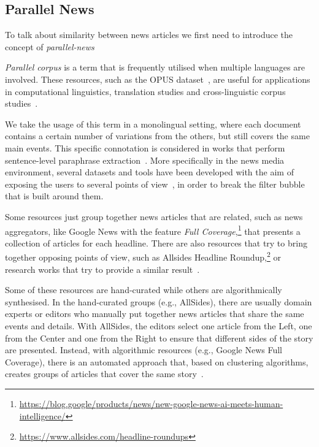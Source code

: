 \subsection{Parallel News}
\label{ssec:lit_relationships_parallel}

To talk about similarity between news articles we first need to introduce the concept of \emph{\gls{parallel-news}}

\emph{Parallel corpus} is a term that is frequently utilised when multiple languages are involved.
These resources, such as the OPUS dataset~\citep{tiedemann2012parallel}, are useful for applications in computational linguistics, translation studies and cross-linguistic corpus studies~\citep{brown1991aligning,ramesh2022samanantar,ziemski2016united,kunchukuttan2017iit,banon2020paracrawl}.

We take the usage of this term in a monolingual setting, where each document contains a certain number of variations from the others, but still covers the same main events.
This specific connotation is considered in works that perform sentence-level paraphrase extraction~\citep{dolan2004unsupervised,zhang2013harvesting}.
More specifically in the news media environment, several datasets and tools have been developed with the aim of exposing the users to several points of view~\citep{bozdag2015breaking}, in order to break the filter bubble~\citep{pariser2011filter} that is built around them.

Some resources just group together news articles that are related, such as news aggregators, like Google News with the feature \emph{Full Coverage},\footnote{\url{https://blog.google/products/news/new-google-news-ai-meets-human-intelligence/}} that presents a collection of articles for each headline.
There are also resources that try to bring together opposing points of view, such as Allsides Headline Roundup,\footnote{\url{https://www.allsides.com/headline-roundups}} or research works that try to provide a similar result~\citep{trampuvs2015diversinews,park2009newscube}.



Some of these resources are hand-curated while others are algorithmically synthesised. In the hand-curated groups (e.g., AllSides), there are usually domain experts or editors who manually put together news articles that share the same events and details. With AllSides, the editors select one article from the Left, one from the Center and one from the Right to ensure that different sides of the story are presented.
Instead, with algorithmic resources (e.g., Google News Full Coverage), there is an automated approach that, based on clustering algorithms, creates groups of articles that cover the same story~\citep{marutho2018determination,alelyani2018feature,karimi2018news}.

